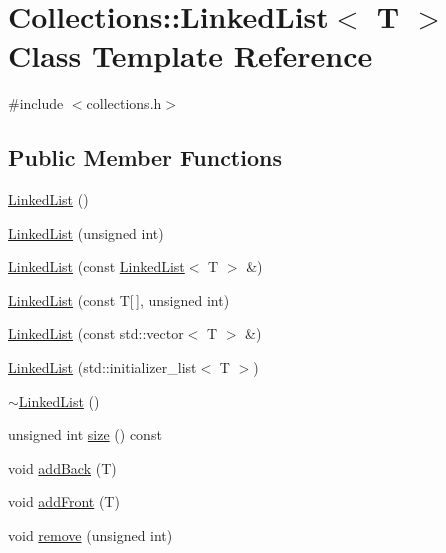 \hypertarget{class_collections_1_1_linked_list}{}\section{Collections\+:\+:Linked\+List$<$ T $>$ Class Template Reference}
\label{class_collections_1_1_linked_list}


{\ttfamily \#include $<$collections.\+h$>$}

\subsection*{Public Member Functions}
\begin{DoxyCompactItemize}
\item 
\hyperlink{class_collections_1_1_linked_list_a547dc3612e33d645182861b562422026}{Linked\+List} ()
\item 
\hyperlink{class_collections_1_1_linked_list_a30fd67a48642d3765239c2ecdc8427cb}{Linked\+List} (unsigned int)
\item 
\hyperlink{class_collections_1_1_linked_list_a98748f998c9a28fbf0767355b44a8d5d}{Linked\+List} (const \hyperlink{class_collections_1_1_linked_list}{Linked\+List}$<$ T $>$ \&)
\item 
\hyperlink{class_collections_1_1_linked_list_af6748fde41f293f6c3e9b945ca811a99}{Linked\+List} (const T\mbox{[}$\,$\mbox{]}, unsigned int)
\item 
\hyperlink{class_collections_1_1_linked_list_a598749544a328460effd5e63dd6ba3cc}{Linked\+List} (const std\+::vector$<$ T $>$ \&)
\item 
\hyperlink{class_collections_1_1_linked_list_aacebe14f1bc1a6c671b51f01b021f772}{Linked\+List} (std\+::initializer\+\_\+list$<$ T $>$)
\item 
\hyperlink{class_collections_1_1_linked_list_ae10b83b464852084807dafd350a32089}{$\sim$\+Linked\+List} ()
\item 
unsigned int \hyperlink{class_collections_1_1_linked_list_a4e8745c011b11dfba9e15ea58959b99a}{size} () const
\item 
void \hyperlink{class_collections_1_1_linked_list_ab79923f4444e818f1b2e98426111af97}{add\+Back} (T)
\item 
void \hyperlink{class_collections_1_1_linked_list_a018e80a402059f6be8766539a019bfd8}{add\+Front} (T)
\item 
void \hyperlink{class_collections_1_1_linked_list_af7199bf3dcefa095a606fbd10df6867a}{remove} (unsigned int)

\end{DoxyCompactItemize}
